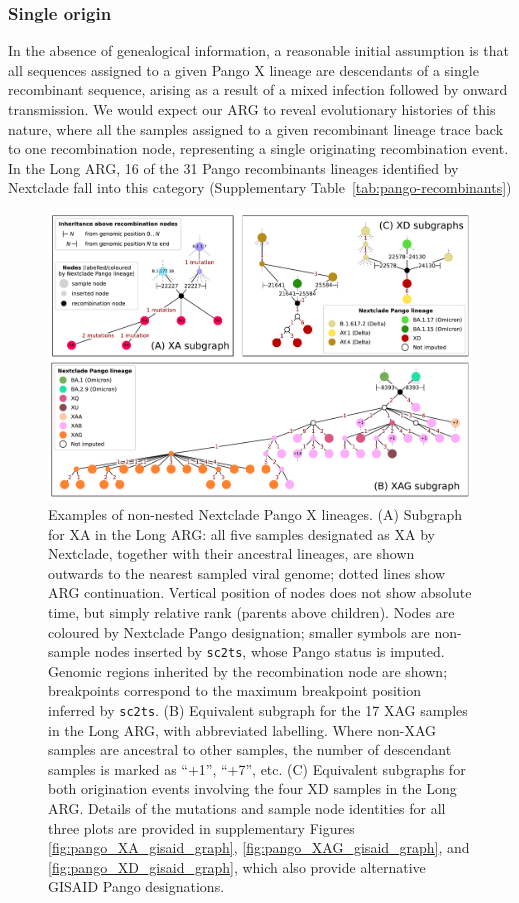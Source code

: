 \documentclass{article}
\begin{document}
\subsubsection{Single origin}
In the absence of genealogical information, a reasonable initial assumption is
that all sequences
assigned to a given Pango X lineage are descendants of a single recombinant
sequence, arising as a result of a mixed infection followed by onward
transmission. We would expect our ARG to reveal evolutionary histories of this
nature, where all the samples assigned to a given recombinant lineage
trace back to one recombination node, representing a single originating
recombination event. In the Long ARG, 16 of the 31 Pango recombinants lineages identified by Nextclade
fall into this category (Supplementary Table~\ref{tab:pango-recombinants})

\begin{figure}
\centering
\includegraphics[width=\textwidth]{figures/Pango_XA_XAG_XD_nxcld_tight_graph.pdf}

\caption{\label{fig:pango-simple-origin-graph} Examples of non-nested
Nextclade Pango X lineages. (A) Subgraph for XA in the Long ARG: all five samples designated
as XA by Nextclade, together with their ancestral lineages, are shown outwards to the nearest
sampled viral genome; dotted lines show ARG continuation. Vertical position of nodes does not
show absolute time, but simply relative rank (parents above children). Nodes are coloured by Nextclade
Pango designation; smaller symbols are non-sample nodes inserted by \texttt{sc2ts}, whose
Pango status is imputed. Genomic regions inherited by the recombination node are shown;
breakpoints correspond to the maximum breakpoint position inferred by \texttt{sc2ts}.
(B) Equivalent subgraph for the 17 XAG samples in the Long ARG, with abbreviated labelling. Where
non-XAG samples are ancestral to other samples, the number of descendant samples is marked as ``+1'',
``+7'', etc.
(C) Equivalent subgraphs for both origination events involving the four XD samples in the Long ARG.
Details of the mutations and sample node identities for all three plots are provided in
supplementary Figures \ref{fig:pango_XA_gisaid_graph}, \ref{fig:pango_XAG_gisaid_graph}, and \ref{fig:pango_XD_gisaid_graph}, which also provide alternative GISAID Pango designations.
} \end{figure}
\end{document}
